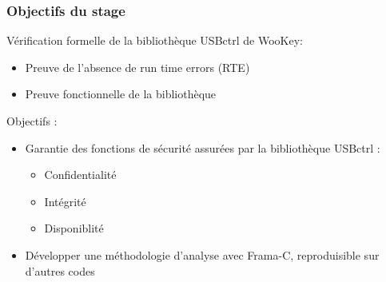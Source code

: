 \documentclass[french]{beamer}
\begin{document}
\begin{frame}[t] %
\frametitle{Objectifs du stage}







 Vérification formelle de la bibliothèque USBctrl de WooKey:
 \begin{itemize}
 \item Preuve de l'absence de run time errors (RTE)
 \item Preuve fonctionnelle de la bibliothèque
 \end{itemize}

 \bigskip

Objectifs :
\begin{itemize}
	\item Garantie des fonctions de sécurité assurées par la bibliothèque USBctrl :
 		\begin{itemize}
 			\item Confidentialité
 			\item Intégrité
 			\item Disponiblité
 		\end{itemize}
 	\item Développer une méthodologie d'analyse avec Frama-C, reproduisible sur d'autres codes
 \end{itemize}

\end{frame}
\end{document}
